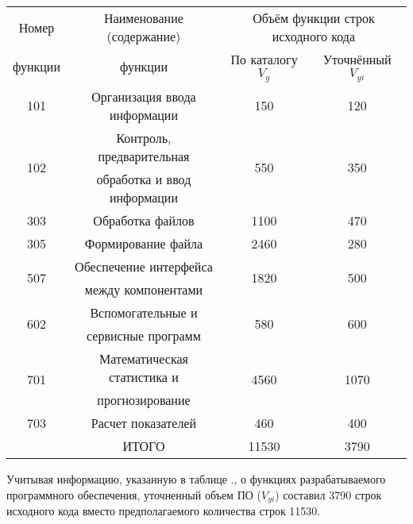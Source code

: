 {{\begin{Center}
		\begin{tabular}{|c|c|c|c|}
		\hline
		Номер  				 & Наименование (содержание) 			& \multicolumn{2}{c|}{Объём функции строк исходного кода} \\ \cline{3-4}
  		функции			     & функции								& По каталогу $V_y$     & Уточнённый $V_{yi}$ 			  \\ \hline
		101 				 & Организация ввода информации         & 150 				    & 120 					          \\ \hline
		\multirow{2}{*}{102} & Контроль, предварительная  			& \multirow{2}{*}{550}  & \multirow{2}{*}{350} 			  \\
		                     & обработка и ввод информации			&                       &                      		      \\ \hline
		303                  & Обработка файлов						& 1100				    & 470							  \\ \hline
		305                  & Формирование файла					& 2460				    & 280							  \\ \hline
		\multirow{2}{*}{507} & Обеспечение интерфейса				& \multirow{2}{*}{1820} & \multirow{2}{*}{500} 			  \\
							 & между компонентами        			&                       &                      		      \\ \hline
		\multirow{2}{*}{602} & Вспомогательные и 					& \multirow{2}{*}{580}  & \multirow{2}{*}{600}			  \\ 
							 & сервисные программ        			&                       &                      		      \\ \hline
		\multirow{2}{*}{701} & Математическая статистика и			& \multirow{2}{*}{4560} & \multirow{2}{*}{1070}			  \\ 
							 & прогнозирование	        			&                       &                      		      \\ \hline
		703                  & Расчет показателей					& 460				    & 400							  \\ \hline
		                     & ИТОГО								& 11530				    & 3790							  \\ \hline
	\end{tabular} \end{Center}}
	\botTablespace

	\redline Учитывая информацию, указанную в таблице \thechaptercntr .\thetablecntr, о функциях разрабатываемого программного обеспечения, уточненный объем ПО ($V_{yi}$) составил 3790 строк исходного кода вместо предполагаемого количества строк 11530. \addtocounter{tablecntr}{1}

	\par
}

